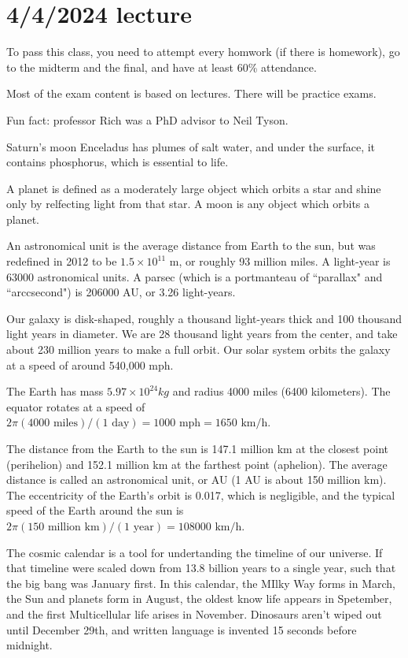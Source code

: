 \documentclass[class=article, crop=false]{standalone}
\begin{document}
\section{4/4/2024 lecture}

To pass this class, you need to attempt every homwork (if there is homework), go to the midterm and the final, and have at least 60\% attendance.
\par
Most of the exam content is based on lectures. There will be practice exams.
\par
Fun fact: professor Rich was a PhD advisor to Neil Tyson.
\par
Saturn's moon Enceladus has plumes of salt water, and under the surface, it contains phosphorus, which is essential to life.
\par
A planet is defined as a moderately large object which orbits a star and shine only by relfecting light from that star. A moon is any object which orbits a planet.
\par
An astronomical unit is the average distance from Earth to the sun, but was redefined in 2012 to be $1.5 \times 10^{11} \text{ m}$, or roughly 93 million miles. A light-year is 63000 astronomical units. A parsec (which is a portmanteau of ``parallax" and ``arccsecond") is 206000 AU, or 3.26 light-years.
\par
Our galaxy is disk-shaped, roughly a thousand light-years thick and 100 thousand light years in diameter. We are 28 thousand light years from the center, and take about 230 million years to make a full orbit. Our solar system orbits the galaxy at a speed of around 540,000 mph.
\par
The Earth has mass $5.97 \times 10^{24} kg$ and radius 4000 miles (6400 kilometers). The equator rotates at a speed of $2 \pi (4000 \text{ miles}) / (1 \text{ day}) = 1000 \text{ mph} = 1650 \text{ km/h}$.
\par
The distance from the Earth to the sun is 147.1 million km at the closest point (perihelion) and 152.1 million km at the farthest point (aphelion). The average distance is called an astronomical unit, or AU (1 AU is about 150 million km). The eccentricity of the Earth's orbit is 0.017, which is negligible, and the typical speed of the Earth around the sun is $2 \pi (150 \text{ million km}) / (1 \text{ year}) = 108000 \text{ km/h}$.
\par
The cosmic calendar is a tool for undertanding the timeline of our universe. If that timeline were scaled down from 13.8 billion years to a single year, such that the big bang was January first. In this calendar, the MIlky Way forms in March, the Sun and planets form in August, the oldest know life appears in Spetember, and the first Multicellular life arises in November. Dinosaurs aren't wiped out until December 29th, and written language is invented 15 seconds before midnight.
\end{document}
